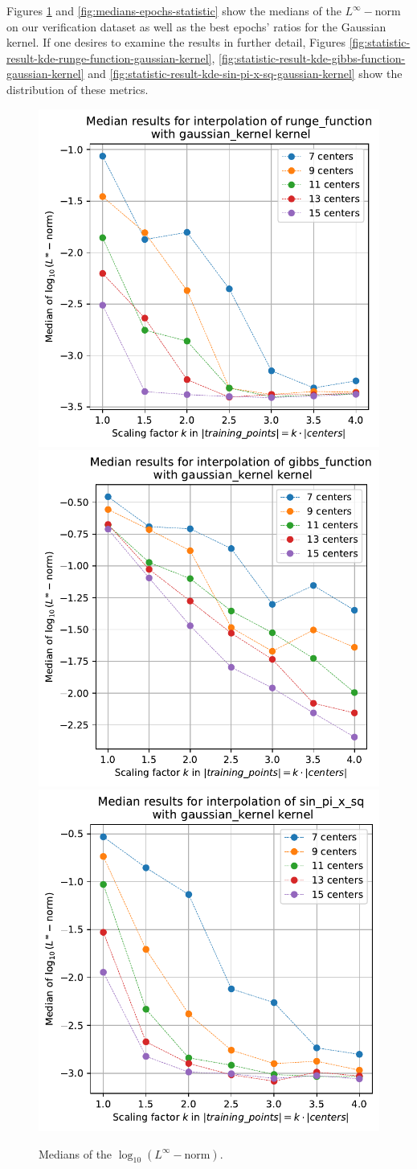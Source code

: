 \documentclass[12pt]{report} %
\begin{document}
Figures \ref{fig:medians-linf-statistic} and \ref{fig:medians-epochs-statistic} show the medians of the $L^\infty-$norm on our verification dataset as well as the best epochs' ratios for the Gaussian kernel. 
If one desires to examine the results in further detail, Figures \ref{fig:statistic-result-kde-runge-function-gaussian-kernel}, \ref{fig:statistic-result-kde-gibbs-function-gaussian-kernel} and \ref{fig:statistic-result-kde-sin-pi-x-sq-gaussian-kernel} show the distribution of these metrics.

\begin{figure}[H]
  {\includegraphics[height=.45\textwidth]
    {imagenes/experiments/1d/statistical_1d_full/medians_linf_runge_function_gaussian_kernel.pdf}}
  {\includegraphics[height=.45\textwidth]
    {imagenes/experiments/1d/statistical_1d_full/gibbs_function/medians_linf_gibbs_function_gaussian_kernel.pdf}}
  {\includegraphics[height=.45\textwidth]
    {imagenes/experiments/1d/statistical_1d_full/sin_pi_x_sq/medians_linf_sin_pi_x_sq_gaussian_kernel.pdf}}
  \caption{Medians of the $\log_{10}(L^\infty-\text{norm})$.}
  \label{fig:medians-linf-statistic}
\end{figure}
\end{document}
